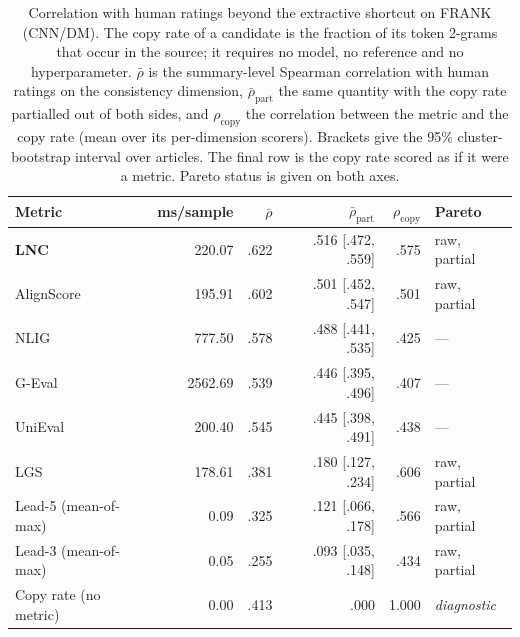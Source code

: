 \begin{table}[t]
\centering
\caption{Correlation with human ratings beyond the extractive shortcut on FRANK (CNN/DM). The copy rate of a candidate is the fraction of its token 2-grams that occur in the source; it requires no model, no reference and no hyperparameter. $\bar{\rho}$ is the summary-level Spearman correlation with human ratings on the consistency dimension, $\bar{\rho}_{\mathrm{part}}$ the same quantity with the copy rate partialled out of both sides, and $\rho_{\mathrm{copy}}$ the correlation between the metric and the copy rate (mean over its per-dimension scorers). Brackets give the 95\% cluster-bootstrap interval over articles. The final row is the copy rate scored as if it were a metric. Pareto status is given on both axes.}
\label{tab:transfer_frank_cnndm_confound}
\small
\linespread{1}\selectfont
\setlength{\tabcolsep}{4pt}
\begin{tabular}{@{}lrrrrl@{}}
\toprule
Metric & ms/sample & $\bar{\rho}$ & $\bar{\rho}_{\mathrm{part}}$ & $\rho_{\mathrm{copy}}$ & Pareto \\
\midrule
\textbf{LNC} & 220.07 & .622 & .516 {\scriptsize [.472, .559]} & .575 & raw, partial \\
AlignScore & 195.91 & .602 & .501 {\scriptsize [.452, .547]} & .501 & raw, partial \\
NLIG & 777.50 & .578 & .488 {\scriptsize [.441, .535]} & .425 & --- \\
G-Eval & 2562.69 & .539 & .446 {\scriptsize [.395, .496]} & .407 & --- \\
UniEval & 200.40 & .545 & .445 {\scriptsize [.398, .491]} & .438 & --- \\
LGS & 178.61 & .381 & .180 {\scriptsize [.127, .234]} & .606 & raw, partial \\
Lead-5 (mean-of-max) & 0.09 & .325 & .121 {\scriptsize [.066, .178]} & .566 & raw, partial \\
Lead-3 (mean-of-max) & 0.05 & .255 & .093 {\scriptsize [.035, .148]} & .434 & raw, partial \\
\midrule
Copy rate (no metric) & 0.00 & .413 & .000 & 1.000 & \emph{diagnostic} \\
\bottomrule
\end{tabular}
\end{table}
